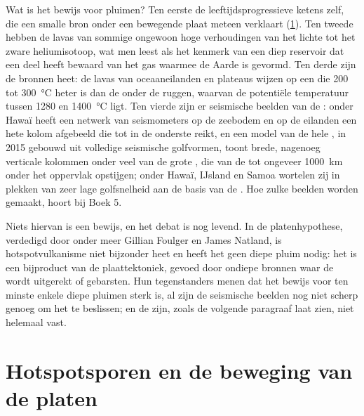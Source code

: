 Wat is het bewijs voor pluimen? Ten eerste de leeftijdsprogressieve ketens zelf, die een smalle bron onder een bewegende plaat meteen verklaart (\cref{sec:b1:hotspots:tracks}). Ten tweede hebben de lavas van sommige  ongewoon hoge verhoudingen van het lichte tot het zware heliumisotoop, wat men leest als het kenmerk van een diep reservoir dat een deel heeft bewaard van het gas waarmee de Aarde is gevormd. Ten derde zijn de bronnen heet: de lavas van oceaaneilanden en plateaus wijzen op een  die 200 tot \qty{300}{\celsius} heter is dan de  onder de ruggen, waarvan de potentiële temperatuur tussen 1280 en \qty{1400}{\celsius} ligt. Ten vierde zijn er seismische beelden van de : onder Hawaï heeft een netwerk van seismometers op de zeebodem en op de eilanden een hete kolom afgebeeld die tot in de onderste  reikt, en een model van de hele , in 2015 gebouwd uit volledige seismische golfvormen, toont brede, nagenoeg verticale kolommen onder veel van de grote , die van de  tot ongeveer \qty{1000}{km} onder het oppervlak opstijgen; onder Hawaï, IJsland en Samoa wortelen zij in plekken van zeer lage golfsnelheid aan de basis van de . Hoe zulke beelden worden gemaakt, hoort bij Boek 5.

Niets hiervan is een bewijs, en het debat is nog levend. In de platenhypothese, verdedigd door onder meer Gillian Foulger en James Natland, is hotspotvulkanisme niet bijzonder heet en heeft het geen diepe pluim nodig: het is een bijproduct van de plaattektoniek, gevoed door ondiepe bronnen waar de  wordt uitgerekt of gebarsten. Hun tegenstanders menen dat het bewijs voor ten minste enkele diepe pluimen sterk is, al zijn de seismische beelden nog niet scherp genoeg om het te beslissen; en de  zijn, zoals de volgende paragraaf laat zien, niet helemaal vast.

\section{Hotspotsporen en de beweging van de platen}\label{sec:b1:hotspots:tracks}


